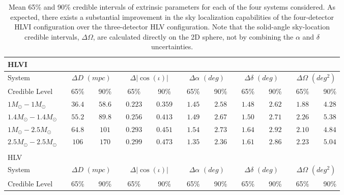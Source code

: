 \documentclass[11pt,a4paper]{emulateapj} 
\begin{document}
 
\begin{table}[t!]
\centering
\caption{Mean 65\% and 90\% credible intervals of extrinsic parameters for
  each of the four systems considered.  As expected, there exists a
  substantial improvement in the sky localization capabilities of the
  four-detector HLVI configuration over the three-detector HLV
  configuration.  Note that the solid-angle sky-location credible
  intervals, $\Delta\Omega$, are calculated directly on the 2D sphere,
  not by combining the $\alpha$ and $\delta$ uncertainties.}
  
  \tabcolsep=0.11cm
      {\renewcommand{\arraystretch}{1.3} 
\begin{tabular}{lcccccccccccccccccccc}

\\HLVI\\ 
\hline\hline System & \vline & \multicolumn{3}{c}{$\Delta D$ $(mpc)$} & \vline &
\multicolumn{3}{c}{$\Delta |\cos(\iota)|$} & \vline & \multicolumn{3}{c}{$\Delta \alpha$ $(deg)$} & \vline &
\multicolumn{3}{c}{$\Delta \delta$ $(deg)$} & \vline & \multicolumn{3}{c}{$\Delta\Omega$
$(deg^2)$}\\\hline
Credible Level & \vline & 65\% & \vline & 90\% & \vline & 65\% & \vline & 90\% & \vline & 65\% & \vline & 90\% & \vline & 65\% & \vline & 90\% & \vline & 65\% & \vline & 90\% \\
 \hline\hline 
$1M_{\odot}-1M_{\odot}$ & \vline &$36.4$ & \vline &$58.6$ & \vline & $0.223$ & \vline &$0.359$ & \vline & $1.45$ & \vline &$2.58$ & \vline & $1.48$ & \vline &$2.62$ & \vline & $1.88$ & \vline &$4.28$\\\hline$1.4M_{\odot}-1.4M_{\odot}$ & \vline &$55.2$ & \vline &$89.8$ & \vline & $0.256$ & \vline &$0.413$ & \vline & $1.49$ & \vline &$2.67$ & \vline & $1.50$ & \vline &$2.71$ & \vline & $2.26$ & \vline &$5.38$\\\hline$1M_{\odot}-2.5M_{\odot}$ & \vline &$64.8$ & \vline &$101$ & \vline & $0.293$ & \vline &$0.451$ & \vline & $1.54$ & \vline &$2.73$ & \vline & $1.64$ & \vline &$2.92$ & \vline & $2.10$ & \vline &$4.84$\\\hline$2.5M_{\odot}-2.5M_{\odot}$ & \vline &$106$ & \vline &$170$ & \vline & $0.299$ & \vline &$0.473$ & \vline & $1.35$ & \vline &$2.36$ & \vline & $1.61$ & \vline &$2.86$ & \vline & $2.23$ & \vline &$5.04$\\\hline

\\ HLV\\

\hline\hline System & \vline & \multicolumn{3}{c}{$\Delta D$ $(mpc)$} & \vline &
\multicolumn{3}{c}{$\Delta |\cos(\iota)|$} & \vline & \multicolumn{3}{c}{$\Delta \alpha$ $(deg)$} & \vline &
\multicolumn{3}{c}{$\Delta \delta$ $(deg)$} & \vline & \multicolumn{3}{c}{$\Delta\Omega$
$(deg^2)$}\\\hline
Credible Level & \vline & 65\% & \vline & 90\% & \vline & 65\% & \vline & 90\% & \vline & 65\% & \vline & 90\% & \vline & 65\% & \vline & 90\% & \vline & 65\% & \vline & 90\% \\
 \hline\hline 


\end{tabular}}
\end{table}
\end{document}
